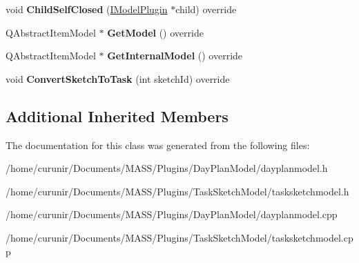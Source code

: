 \begin{DoxyCompactItemize}
\item 
void {\bfseries Child\+Self\+Closed} (\hyperlink{class_i_model_plugin}{I\+Model\+Plugin} $\ast$child) override\hypertarget{class_task_sketch_model_ab64b7d0896769163fb7cb5c786c67efe}{}\label{class_task_sketch_model_ab64b7d0896769163fb7cb5c786c67efe}

\item 
Q\+Abstract\+Item\+Model $\ast$ {\bfseries Get\+Model} () override\hypertarget{class_task_sketch_model_a0dd67cee0f8226875afb1d2a6ad149ac}{}\label{class_task_sketch_model_a0dd67cee0f8226875afb1d2a6ad149ac}

\item 
Q\+Abstract\+Item\+Model $\ast$ {\bfseries Get\+Internal\+Model} () override\hypertarget{class_task_sketch_model_a0a4c037dc96fdc0aa7aaa5353d5a95d9}{}\label{class_task_sketch_model_a0a4c037dc96fdc0aa7aaa5353d5a95d9}

\item 
void {\bfseries Convert\+Sketch\+To\+Task} (int sketch\+Id) override\hypertarget{class_task_sketch_model_ab347bbadaee4f9f5bb29964ca95377bc}{}\label{class_task_sketch_model_ab347bbadaee4f9f5bb29964ca95377bc}

\end{DoxyCompactItemize}
\subsection*{Additional Inherited Members}


The documentation for this class was generated from the following files\+:\begin{DoxyCompactItemize}
\item 
/home/curunir/\+Documents/\+M\+A\+S\+S/\+Plugins/\+Day\+Plan\+Model/dayplanmodel.\+h\item 
/home/curunir/\+Documents/\+M\+A\+S\+S/\+Plugins/\+Task\+Sketch\+Model/tasksketchmodel.\+h\item 
/home/curunir/\+Documents/\+M\+A\+S\+S/\+Plugins/\+Day\+Plan\+Model/dayplanmodel.\+cpp\item 
/home/curunir/\+Documents/\+M\+A\+S\+S/\+Plugins/\+Task\+Sketch\+Model/tasksketchmodel.\+cpp\end{DoxyCompactItemize}
